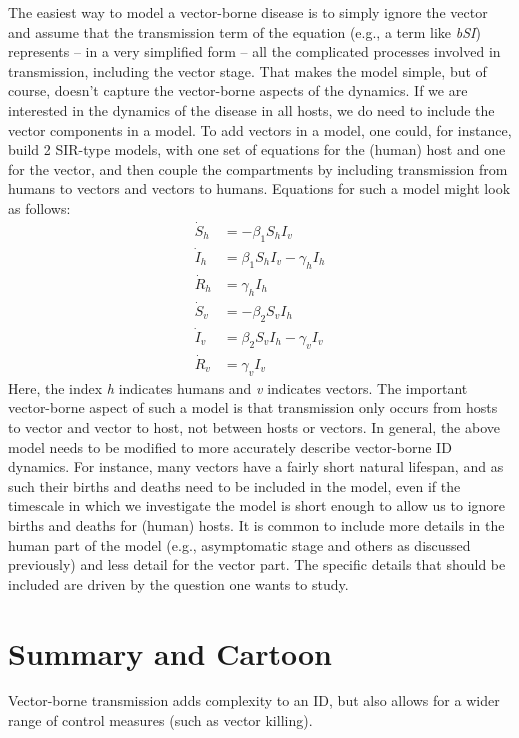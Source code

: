 \documentclass[]{book}
\theoremstyle{definition}
\theoremstyle{definition}
\theoremstyle{definition}
\theoremstyle{remark}
\begin{document}
The easiest way to model a vector-borne disease is to simply ignore the
vector and assume that the transmission term of the equation (e.g., a
term like \emph{bSI}) represents -- in a very simplified form -- all the
complicated processes involved in transmission, including the vector
stage. That makes the model simple, but of course, doesn't capture the
vector-borne aspects of the dynamics. If we are interested in the
dynamics of the disease in all hosts, we do need to include the vector
components in a model. To add vectors in a model, one could, for
instance, build 2 SIR-type models, with one set of equations for the
(human) host and one for the vector, and then couple the compartments by
including transmission from humans to vectors and vectors to humans.
Equations for such a model might look as follows: \[
\begin{aligned}
\dot S_h &= - \beta_1 S_h I_v \\
\dot I_h &= \beta_1S_h I_v - \gamma_h I_h \\
\dot R_h &= \gamma_h I_h \\
\dot S_v &= - \beta_2 S_v I_h \\
\dot I_v &= \beta_2 S_v I_h - \gamma_v I_v \\
\dot R_v &= \gamma_v I_v
\end{aligned}
\] Here, the index \emph{h} indicates humans and \emph{v} indicates
vectors. The important vector-borne aspect of such a model is that
transmission only occurs from hosts to vector and vector to host, not
between hosts or vectors. In general, the above model needs to be
modified to more accurately describe vector-borne ID dynamics. For
instance, many vectors have a fairly short natural lifespan, and as such
their births and deaths need to be included in the model, even if the
timescale in which we investigate the model is short enough to allow us
to ignore births and deaths for (human) hosts. It is common to include
more details in the human part of the model (e.g., asymptomatic stage
and others as discussed previously) and less detail for the vector part.
The specific details that should be included are driven by the question
one wants to study.

\section{Summary and Cartoon}\label{summary-and-cartoon-7}

Vector-borne transmission adds complexity to an ID, but also allows for
a wider range of control measures (such as vector killing).
\end{document}
